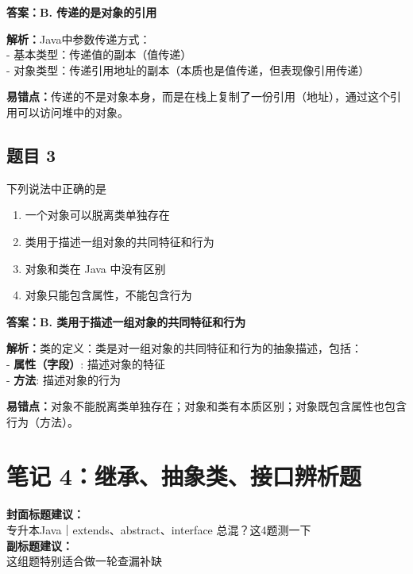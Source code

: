 \documentclass[12pt,a4paper]{ctexart}
\begin{document}
\begin{answerbox}
	\textbf{答案：B. 传递的是对象的引用}

	\textbf{解析：}Java中参数传递方式：\\
	- 基本类型：传递值的副本（值传递）\\
	- 对象类型：传递引用地址的副本（本质也是值传递，但表现像引用传递）

	\textbf{易错点：}传递的不是对象本身，而是在栈上复制了一份引用（地址），通过这个引用可以访问堆中的对象。
\end{answerbox}

\subsection*{题目 3}
下列说法中正确的是
\begin{enumerate}[label=\Alph*.]
	\item 一个对象可以脱离类单独存在
	\item 类用于描述一组对象的共同特征和行为
	\item 对象和类在 Java 中没有区别
	\item 对象只能包含属性，不能包含行为
\end{enumerate}

\begin{answerbox}
	\textbf{答案：B. 类用于描述一组对象的共同特征和行为}

	\textbf{解析：}类的定义：类是对一组对象的共同特征和行为的抽象描述，包括：\\
	- \textbf{属性（字段）}: 描述对象的特征\\
	- \textbf{方法}: 描述对象的行为

	\textbf{易错点：}对象不能脱离类单独存在；对象和类有本质区别；对象既包含属性也包含行为（方法）。
\end{answerbox}

\newpage

\section{笔记 4：继承、抽象类、接口辨析题}
\begin{coverbox}
	\textbf{封面标题建议：}\\
	专升本Java｜extends、abstract、interface 总混？这4题测一下\\
	\textbf{副标题建议：}\\
	这组题特别适合做一轮查漏补缺
\end{coverbox}
\end{document}
